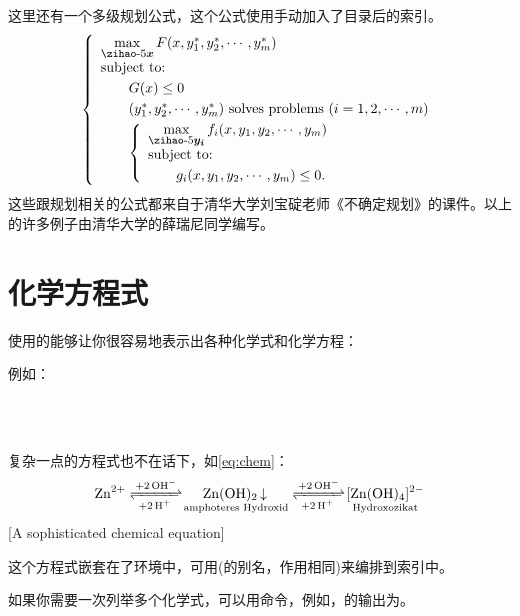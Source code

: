 这里还有一个多级规划公式，这个公式使用手动加入了目录后的索引。
\begin{equation}\label{bilevel}
\left\{\begin{array}{l}
\max\limits_{{\mbox{\footnotesize\boldmath $x$}}} F(x,y_1^*,y_2^*,\cdots,y_m^*)\\[0.2cm]
\mbox{subject to:}\\[0.1cm]
\qquad G(x)\le 0\\[0.1cm]
\qquad(y_1^*,y_2^*,\cdots,y_m^*)\mbox{ solves problems }(i=1,2,\cdots,m)\\[0.1cm]
\qquad\left\{\begin{array}{l}
\max\limits_{{\mbox{\footnotesize\boldmath $y_i$}}}f_i(x,y_1,y_2,\cdots,y_m)\\[0.2cm]
\mbox{subject to:}\\[0.1cm]
\qquad g_i(x,y_1,y_2,\cdots,y_m)\le 0.
\end{array}\right.
\end{array}\right.
\end{equation}
这些跟规划相关的公式都来自于清华大学刘宝碇老师《不确定规划》的课件。以上的许多例子由清华大学的薛瑞尼同学编写。

\section{化学方程式}

使用的能够让你很容易地表示出各种化学式和化学方程：

例如：
\begin{center}
	\\ \\ 
\end{center}

复杂一点的方程式也不在话下，如\eqref{eq:chem}：
\begin{equation}\label{eq:chem}
	\ce{Zn^2+
		<=>[+ 2OH-][+ 2H+]
		$\underset{\text{amphoteres Hydroxid}}{\ce{Zn(OH)2 v}}$ <=>[+ 2OH-][+ 2H+]
		$\underset{\text{Hydroxozikat}}{\ce{[Zn(OH)4]^2-}}$
	}
\end{equation}[A sophisticated chemical equation]

这个方程式嵌套在了环境中，可用(的别名，作用相同)来编排到索引中。

如果你需要一次列举多个化学式，可以用命令，例如，的输出为。

